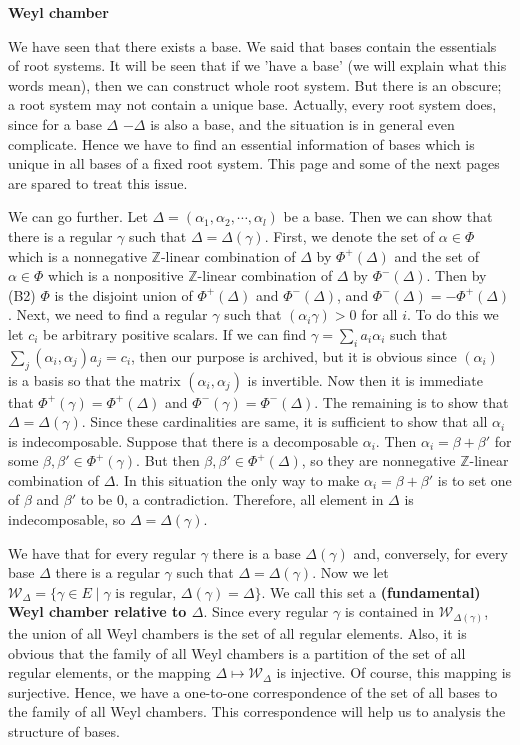 \documentclass{article}
\newcommand{\InZ}{\mathbb{Z}}
\newcommand{\SBar}{\;|\;}
\begin{document}
\newpage

\textbf{Weyl chamber}

We have seen that there exists a base.
We said that bases contain the essentials of root systems.
It will be seen that if we 'have a base' (we will explain what this words mean), then we can construct whole root system.
But there is an obscure; a root system may not contain a unique base.
Actually, every root system does, since for a base $\Delta$ $-\Delta$ is also a base, and the situation is in general even complicate.
Hence we have to find an essential information of bases which is unique in all bases of a fixed root system.
This page and some of the next pages are spared to treat this issue.

We can go further.
Let $\Delta = (\alpha_1, \alpha_2, \cdots, \alpha_l)$ be a base.
Then we can show that there is a regular $\gamma$ such that $\Delta = \Delta(\gamma)$.
First, we denote the set of $\alpha \in \Phi$ which is a nonnegative $\InZ$-linear combination of $\Delta$ by $\Phi^+(\Delta)$ and the set of $\alpha \in \Phi$ which is a nonpositive $\InZ$-linear combination of $\Delta$ by $\Phi^-(\Delta)$.
Then by (B2) $\Phi$ is the disjoint union of $\Phi^+(\Delta)$ and $\Phi^-(\Delta)$, and $\Phi^-(\Delta) = -\Phi^+(\Delta)$.
Next, we need to find a regular $\gamma$ such that $(\alpha_i \gamma) > 0$ for all $i$.
To do this we let $c_i$ be arbitrary positive scalars.
If we can find $\gamma = \sum_i a_i \alpha_i$ such that $\sum_j (\alpha_i, \alpha_j) a_j = c_i$, then our purpose is archived, but it is obvious since $(\alpha_i)$ is a basis so that the matrix $(\alpha_i, \alpha_j)$ is invertible.
Now then it is immediate that $\Phi^+(\gamma) = \Phi^+(\Delta)$ and $\Phi^-(\gamma) = \Phi^-(\Delta)$.
The remaining is to show that $\Delta = \Delta(\gamma)$.
Since these cardinalities are same, it is sufficient to show that all $\alpha_i$ is indecomposable.
Suppose that there is a decomposable $\alpha_i$.
Then $\alpha_i = \beta + \beta'$ for some $\beta, \beta' \in \Phi^+(\gamma)$.
But then $\beta, \beta' \in \Phi^+(\Delta)$, so they are nonnegative $\InZ$-linear combination of $\Delta$.
In this situation the only way to make $\alpha_i = \beta + \beta'$ is to set one of $\beta$ and $\beta'$ to be 0, a contradiction.
Therefore, all element in $\Delta$ is indecomposable, so $\Delta = \Delta(\gamma)$.

We have that for every regular $\gamma$ there is a base $\Delta(\gamma)$ and, conversely, for every base $\Delta$ there is a regular $\gamma$ such that $\Delta = \Delta(\gamma)$.
Now we let $\mathcal{W}_\Delta = \{\gamma \in E \SBar \textrm{$\gamma$ is regular, } \Delta(\gamma) = \Delta\}$.
We call this set a \textbf{(fundamental) Weyl chamber relative to $\Delta$}.
Since every regular $\gamma$ is contained in $\mathcal{W}_{\Delta(\gamma)}$, the union of all Weyl chambers is the set of all regular elements.
Also, it is obvious that the family of all Weyl chambers is a partition of the set of all regular elements, or the mapping $\Delta \mapsto \mathcal{W}_\Delta$ is injective.
Of course, this mapping is surjective.
Hence, we have a one-to-one correspondence of the set of all bases to the family of all Weyl chambers.
This correspondence will help us to analysis the structure of bases.
\end{document}
